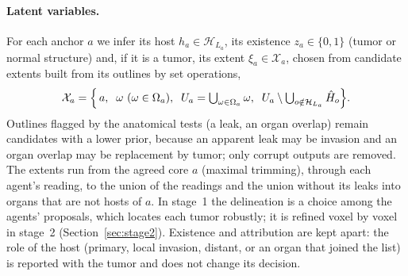 \documentclass[fleqn,10pt]{olplainarticle}
\begin{document}
\paragraph{Latent variables.}
For each anchor $a$ we infer its host $h_a\in\mathcal{H}_{L_a}$, its existence $z_a\in\{0,1\}$ (tumor or normal structure)
and, if it is a tumor, its extent $\xi_a\in\mathcal{X}_a$, chosen from candidate extents built from its outlines by set
operations,
\begin{equation}
\label{eq:extents}
\mathcal{X}_a=\Bigl\{\,a,\;\;\omega\ (\omega\in\Omega_a),\;\;U_a=\textstyle\bigcup_{\omega\in\Omega_a}\omega,\;\;
U_a\setminus\bigcup_{o\notin\mathcal{H}_{L_a}}\hat H_{o}\Bigr\}.
\end{equation}
Outlines flagged by the anatomical tests (a leak, an organ overlap) remain candidates with a lower prior, because an
apparent leak may be invasion and an organ overlap may be replacement by tumor; only corrupt outputs are removed. The
extents run from the agreed core $a$ (maximal trimming), through each agent's reading, to the union of the readings and
the union without its leaks into organs that are not hosts of $a$. In stage~1 the delineation is a choice among the agents' proposals,
which locates each tumor robustly; it is refined voxel by voxel in stage~2 (Section~\ref{sec:stage2}). Existence and attribution are kept apart: the role of the host
(primary, local invasion, distant, or an organ that joined the list) is reported with the tumor and does not change its
decision.
\end{document}
